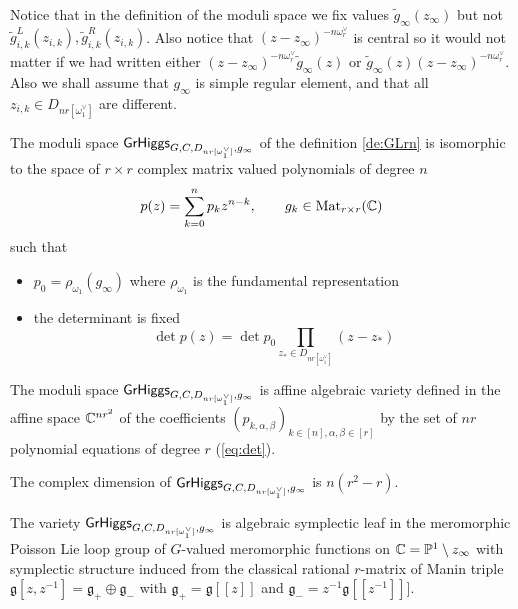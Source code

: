 \documentclass[12pt,psamsfonts,reqno]{amsart}
\begin{document}
\begin{remark}
Notice that in the definition of the moduli space we fix values $\tilde g_{\infty}(z_\infty)$ but not $\tilde g_{i,k}^{L}(z_{i,k}), \tilde g_{i,k}^{R}(z_{i,k})$. Also notice that $(z - z_\infty)^{-n\omega_r^{\vee}}$ is central so it would not matter if we had written either $(z-z_{\infty})^{-n \omega_{r}^{\vee}} \tilde g_{\infty}(z)$ or $\tilde g_{\infty}(z) (z-z_{\infty})^{-n \omega_{r}^{\vee}}$. Also we shall assume that $g_{\infty}$ is simple regular element, and that all $z_{i,k} \in D_{nr[\omega_1^{\vee}]}$ are
different. 


\begin{proposition}
  The moduli space $\mathsf{GrHiggs}_{G,C,D_{nr[\omega_1^{\vee}]},g_\infty}$ of the definition \ref{de:GLrn} is isomorphic to the space
  of $r \times r$ complex matrix valued polynomials of degree $n$
  \begin{equation}
    p(z) =  \sum_{k=0}^{n} p_{k} z^{n-k} ,\qquad g_k \in \mathrm{Mat}_{r \times r}(\mathbb C)
  \end{equation}
  such that
  \begin{itemize}
  \item $p_{0}  = \rho_{\omega_1} (g_{\infty})$ where $\rho_{\omega_1}$ is the    fundamental representation 
  \item the determinant is fixed
    \begin{equation}
\label{eq:det}
      \det p(z)  = \det p_0  \prod_{z_{*} \in D_{nr[\omega_1^{\vee}]}} (z - z_{*})
    \end{equation}
  \end{itemize}
\end{proposition}

\begin{proposition}
  The moduli space $\mathsf{GrHiggs}_{G,C,D_{nr[\omega_1^{\vee}]},g_\infty}$ is affine algebraic variety defined in the affine space $\mathbb C^{n r^2}$ of the 
coefficients $(p_{k,\alpha,\beta})_{k \in [n], \alpha, \beta \in [r]}$
by the set of $nr$ polynomial equations of degree $r$ (\ref{eq:det}).


\end{proposition}

\begin{proposition}
The complex dimension of $\mathsf{GrHiggs}_{G,C,D_{nr[\omega_1^{\vee}]},g_\infty}$ is $ n (r^2 - r)$.
\end{proposition}

\begin{proposition}
  The variety $\mathsf{GrHiggs}_{G,C,D_{nr[\omega_1^{\vee}]},g_\infty}$ is algebraic symplectic leaf in the meromorphic Poisson Lie loop
  group of $G$-valued meromorphic functions on $\mathbb C = \mathbb P^1 \setminus z_{\infty}$ with symplectic structure induced from 
 the classical rational $r$-matrix of Manin triple $\mathfrak{g}[z, z^{-1}] = \mathfrak{g}_{+} \oplus \mathfrak{g}_{-}$  with $\mathfrak{g}_{+} = \mathfrak{g}[[z]]$ and $\mathfrak{g}_{-} = z^{-1} \mathfrak{g}[[z^{-1}]]]$. 
\end{proposition}


\end{remark}
\end{document}
